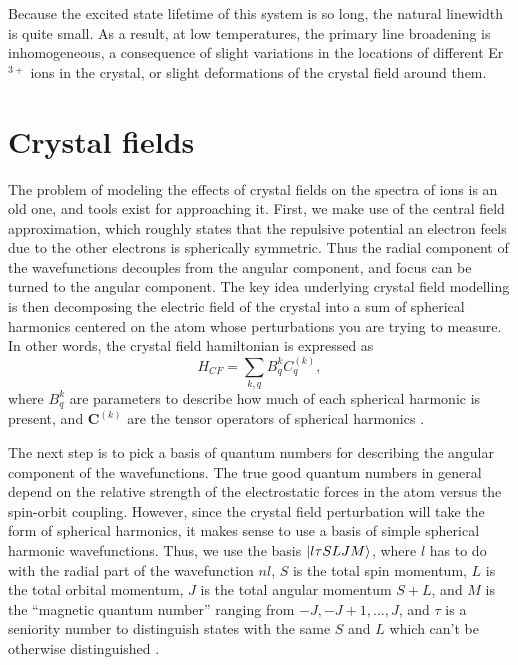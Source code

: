 \documentclass[12pt]{report}
\newcommand{\erbium}[1][ ]{Er$^{3+}$#1}
\begin{document}
Because the excited state lifetime of this system is so long, the natural linewidth is quite small. As a result, at low temperatures, the primary line broadening is inhomogeneous, a consequence of slight variations in the locations of different \erbium ions in the crystal, or slight deformations of the crystal field around them.


\section{Crystal fields}
\label{sec:crystal-fields}

The problem of modeling the effects of crystal fields on the spectra of ions is an old one, and tools exist for approaching it. First, we make use of the central field approximation, which roughly states that the repulsive potential an electron feels due to the other electrons is spherically symmetric. Thus the radial component of the wavefunctions decouples from the angular component, and focus can be turned to the angular component. The key idea underlying crystal field modelling is then decomposing the electric field of the crystal into a sum of spherical harmonics centered on the atom whose perturbations you are trying to measure. In other words, the crystal field hamiltonian is expressed as 
\begin{equation}\label{eq:3}
  H_{CF} = \sum_{k, q}B_{q}^{k}C_{q}^{(k)},
\end{equation}
where $B_{q}^{k}$ are parameters to describe how much of each spherical harmonic is present, and $\mathbf{C}^{(k)}$ are the tensor operators of spherical harmonics \cite{Liu2006}.

The next step is to pick a basis of quantum numbers for describing the angular component of the wavefunctions. The true good quantum numbers in general depend on the relative strength of the electrostatic forces in the atom versus the spin-orbit coupling. However, since the crystal field perturbation will take the form of spherical harmonics, it makes sense to use a basis of simple spherical harmonic wavefunctions. Thus, we use the basis $\ket{l\tau SLJM}$, where $l$ has to do with the radial part of the wavefunction $nl$, $S$ is the total spin momentum, $L$ is the total orbital momentum, $J$ is the total angular momentum $S+L$, and $M$ is the ``magnetic quantum number'' ranging from $-J,-J+1,...,J$, and $\tau$ is a seniority number to distinguish states with the same $S$ and $L$ which can't be otherwise distinguished \cite{Liu2006}.
\end{document}
